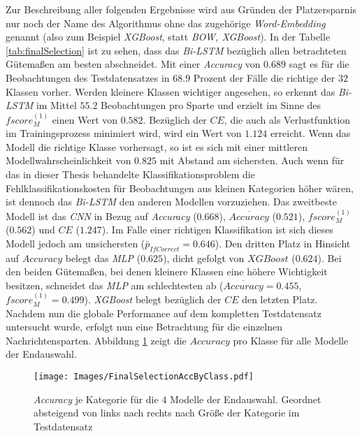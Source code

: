 \documentclass[a4paper,11pt]{article}
\begin{document}
Zur Beschreibung aller folgenden Ergebnisse wird aus Gründen der Platzersparnis nur noch der Name des Algorithmus ohne das zugehörige \textit{Word-Embedding} genannt (also zum Beispiel \textit{XGBoost}, statt \textit{BOW, XGBoost}).
In der Tabelle \ref{tab:finalSelection} ist zu sehen, dass das \textit{Bi-LSTM} bezüglich allen betrachteten Gütemaßen am besten abschneidet. Mit einer \textit{Accuracy} von $0.689$ sagt es für die Beobachtungen des Testdatensatzes in $68.9$ Prozent der Fälle die richtige der $32$ Klassen vorher. Werden kleinere Klassen wichtiger angesehen, so erkennt das \textit{Bi-LSTM} im Mittel $55.2$ Beobachtungen pro Sparte und erzielt im Sinne des $fscore_M^{(1)}$ einen Wert von $0.582$. Bezüglich der $CE$, die auch als Verlustfunktion im Trainingsprozess minimiert wird, wird ein Wert von $1.124$ erreicht. Wenn das Modell die richtige Klasse vorhersagt, so ist es sich mit einer mittleren Modellwahrscheinlichkeit von $0.825$ mit Abstand am sichersten. Auch wenn für das in dieser Thesis behandelte Klassifikationsproblem die Fehlklassifikationskosten für Beobachtungen aus kleinen Kategorien höher wären, ist dennoch das \textit{Bi-LSTM} den anderen Modellen vorzuziehen. Das zweitbeste Modell ist das \textit{CNN} in Bezug auf \textit{Accuracy} ($0.668$),  $\overline{Accuracy}$ ($0.521$), $fscore_M^{(1)}$ ($0.562$) und $CE$ ($1.247$). Im Falle einer richtigen Klassifikation ist sich dieses Modell jedoch am unsichersten ($\bar{p}_{IfCorrect} =0.646$). Den dritten Platz in Hinsicht auf $Accuracy$ belegt das \textit{MLP} ($0.625$), dicht gefolgt von $XGBoost$ ($0.624$). Bei den beiden Gütemaßen, bei denen kleinere Klassen eine höhere Wichtigkeit besitzen, schneidet das \textit{MLP} am schlechtesten ab ($\overline{Accuracy} = 0.455$, $fscore_M^{(1)} = 0.499$). \textit{XGBoost} belegt bezüglich der $CE$ den letzten Platz.\\
Nachdem nun die globale Performance auf dem kompletten Testdatensatz untersucht wurde, erfolgt nun eine Betrachtung für die einzelnen Nachrichtensparten. Abbildung \ref{abb:AccByClass} zeigt die $Accuracy$ pro Klasse für alle Modelle der Endauswahl.

\begin{figure}[ht]
    \centering
\texttt{[image: Images/FinalSelectionAccByClass.pdf]} 
\caption{\textit{Accuracy} je Kategorie für die $4$ Modelle der Endauswahl. Geordnet absteigend von links nach rechts nach Größe der Kategorie im Testdatensatz}
\label{abb:AccByClass}
\end{figure}
\end{document}

